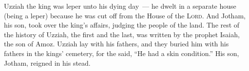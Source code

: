 \begin{inparaenum}
   Uzziah the king was leper unto his dying day~--- he dwelt in a separate house (being a leper) because he was cut off from the House of the \textsc{Lord}. And Jotham, his son, took over the king's affairs, judging the people of the land.%
   The rest of the history of Uzziah, the first and the last, was written by the prophet Isaiah, the son of Amoz.%
   Uzziah lay with his fathers, and they buried him with his fathers in the kings' cemetery, for the said, ``He had a skin condition.'' His son, Jotham, reigned in his stead.%
\end{inparaenum}
